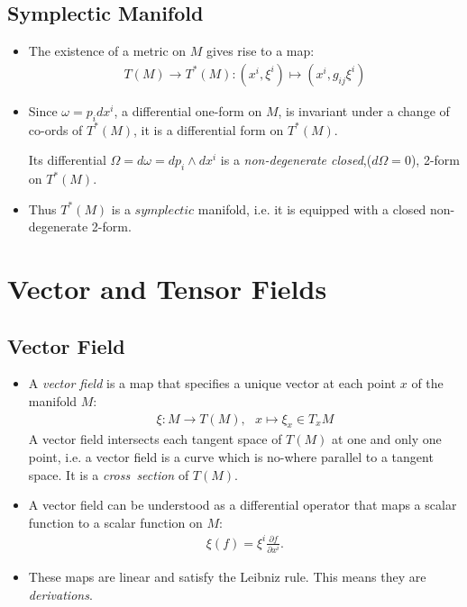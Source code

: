 \documentclass[11pt]{article}
\numberwithin{equation}{section}
\newcommand{\I}[1]{\emph{#1}}
\begin{document}
\subsection{Symplectic Manifold} %
\label{sub:symplectic_manifold}
\begin{itemize}
    \item The existence of a metric on $M$ gives rise to a map:
  \begin{align*}
   T(M) \rightarrow T^{\ast}(M): (x^i,\xi^i)\mapsto (x^i,g_{ij}\xi^i)
   \end{align*} 
   \item Since $\omega = p_idx^i$, a differential one-form on $M$, is invariant under a change of co-ords of $T^{\ast}(M)$, it is a differential form on $T^{\ast}(M)$. 

   Its differential $\Omega = d\omega = dp_i \wedge dx^i$ is a \emph{non-degenerate closed},($d\Omega =0$), 2-form on $T^{\ast}(M)$. 

   \item Thus $T^{\ast}(M)$ is a $symplectic$ manifold, i.e. it is equipped with a closed non-degenerate 2-form. 
 \end{itemize}

\newpage

\section{Vector and Tensor Fields} %
\label{sec:vector_and_tensor_fields}
\subsection{Vector Field} %
\label{sub:vector_field}
\begin{itemize}
  \item A \emph{vector field}  is a map that specifies a unique vector at each point $x$ of the manifold $M$:
  \begin{align*}
    \xi: M \rightarrow T(M), ~~~x\mapsto \xi_x \in T_xM
  \end{align*}
  A vector field intersects each tangent space of $T(M)$ at one and only one point, i.e. a vector field is a curve which is no-where parallel to a tangent space. It is a \emph{cross~section} of $T(M)$. 

    \item A vector field can be understood as a differential operator that maps a scalar function to a scalar function on $M$:
    \begin{align*}
        \xi(f) = \xi^i\frac{\partial f}{\partial x^i}. 
      \end{align*}  
      \item These maps are linear and satisfy the Leibniz rule. This means they are \I{derivations}. 
\end{itemize}
\end{document}
